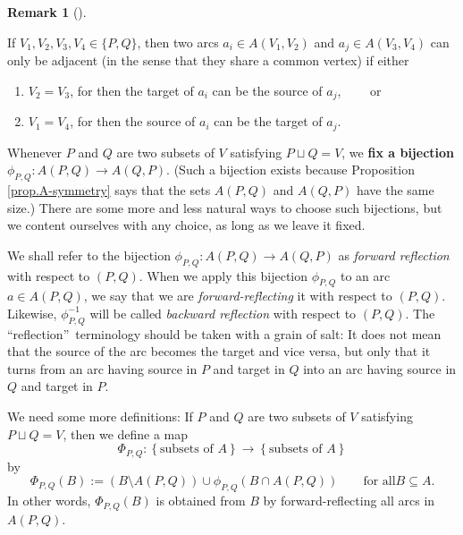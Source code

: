 \documentclass[numbers=enddot,12pt,final,onecolumn,notitlepage]{scrartcl}%
\theoremstyle{definition}
\newtheorem{remk}[theo]{Remark}
\newenvironment{remark}[1][]
{\begin{remk}[#1]\begin{leftbar}}
{\end{leftbar}\end{remk}}
\theoremstyle{plainsl}
\begin{document}
\begin{remark}
\label{adjarcsOLD}
    If $V_{1},V_{2},V_{3},V_{4} \in \{P,Q\}$, then two arcs $a_{i} \in A(V_{1},V_{2})$ and $a_{j} \in A(V_{3},V_{4})$ can only be adjacent (in the sense that they share a common vertex) if either \begin{enumerate}
        \item $V_{2} = V_{3}$, for then the target of $a_{i}$ can be the source of $a_{j}$, \ \ \ \ or
        \item $V_{1} = V_{4}$, for then the source of $a_{i}$ can be the target of $a_{j}$.
    \end{enumerate}
\end{remark}

Whenever $P$ and $Q$ are two subsets of $V$ satisfying $P\sqcup Q=V$, we
\textbf{fix a bijection} $\phi_{P,Q}:A\left(  P,Q\right)  \rightarrow A\left(
Q,P\right)  $. (Such a bijection exists because Proposition
\ref{prop.A-symmetry} says that the sets $A\left(  P,Q\right)  $ and $A\left(
Q,P\right)  $ have the same size.) There are some more and less natural ways
to choose such bijections, but we content ourselves with any choice, as long
as we leave it fixed.

We shall refer to the bijection $\phi_{P,Q}:A\left(  P,Q\right)  \rightarrow
A\left(  Q,P\right)  $ as \emph{forward reflection} with respect to $\left(
P,Q\right)  $. When we apply this bijection $\phi_{P,Q}$ to an arc $a\in
A\left(  P,Q\right)  $, we say that we are \emph{forward-reflecting} it with
respect to $\left(  P,Q\right)  $. Likewise, $\phi_{P,Q}^{-1}$ will be called
\emph{backward reflection} with respect to $\left(  P,Q\right)  $. The
\textquotedblleft reflection\textquotedblright\ terminology should be taken
with a grain of salt: It does not mean that the source of the arc becomes the
target and vice versa, but only that it turns from an arc having source in $P$
and target in $Q$ into an arc having source in $Q$ and target in $P$.

We need some more definitions: If $P$ and $Q$ are two subsets of $V$
satisfying $P\sqcup Q=V$, then we define a map%
\[
\Phi_{P,Q}:\left\{  \text{subsets of }A\right\}  \rightarrow\left\{
\text{subsets of }A\right\}
\]
by%
\[
\Phi_{P,Q}\left(  B\right)  :=\left(  B\setminus A\left(  P,Q\right)  \right)
\cup\phi_{P,Q}\left(  B\cap A\left(  P,Q\right)  \right)  \qquad\text{for all
}B\subseteq A.
\]
In other words, $\Phi_{P,Q}\left(  B\right)  $ is obtained from $B$ by
forward-reflecting all arcs in $A\left(  P,Q\right)  $.
\end{document}
